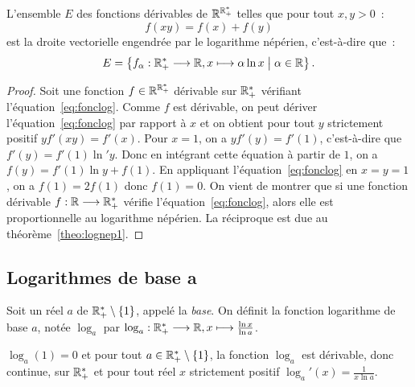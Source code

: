 \begin{theo}
    L'ensemble \(E\) des fonctions dérivables de \(\mathbb{R}^{\mathbb{R}_{+}^{*}}\) 
    telles que pour tout \(x,y>0\)~:
    \begin{equation}
        \label{eq:fonclog}
         f(xy) = f(x)+f(y)
    \end{equation}
    est la droite vectorielle engendrée par le logarithme népérien, 
    c'est-à-dire que~:
    \[E = \left\{f_{\alpha}:\mathbb{R}_{+}^{*} \longrightarrow \mathbb{R}, x \longmapsto \alpha \ln 
    x\mathrel{}\middle|\mathrel{}\alpha \in \mathbb{R}\right\}.\]
\end{theo}

\begin{proof}
    Soit une fonction \(f \in \mathbb{R}^{\mathbb{R}_{+}^{*}}\) dérivable sur 
    \(\mathbb{R}_{+}^{*}\) vérifiant l'équation~\eqref{eq:fonclog}. Comme \(f\) 
    est dérivable, on peut dériver l'équation~\eqref{eq:fonclog} par rapport 
    à \(x\) et on obtient pour tout \(y\) strictement positif 
    \(yf'(xy) = f'(x)\). Pour \(x = 1\), on a \(yf'(y) = f'(1)\), c'est-à-dire que 
    \(f'(y) = f'(1) \ln' y\). Donc en intégrant cette équation à partir de 
    \(1\), on a \(f(y) = f'(1)\ln y + f(1)\). En appliquant 
    l'équation~\eqref{eq:fonclog} en \(x = y = 1\), on a \(f(1) = 2f(1)\) donc 
    \(f(1) = 0\).
    On vient de montrer que si une fonction dérivable 
    \(f:\mathbb{R} \longrightarrow \mathbb{R}_{+}^{*}\) vérifie 
    l'équation~\eqref{eq:fonclog}, alors elle est proportionnelle au 
    logarithme népérien. La réciproque est due au 
    théorème~\ref{theo:lognep1}.
\end{proof}

\subsection{Logarithmes de base a}
\label{subsec:chap1-loga}

\begin{defdef}
    Soit un réel \(a\) de \(\mathbb{R}_{+}^{*}\setminus\{1\}\), appelé la 
    \emph{base}.  On définit la fonction logarithme de base  \(a\), notée 
    \(\log_a\) par \(\log_a:\mathbb{R}_{+}^{*} \longrightarrow \mathbb{R}, x \longmapsto \frac{\ln 
    x}{\ln a}\).
\end{defdef}

\begin{prop}
    \(\log_a(1) = 0\) et pour tout \(a \in\mathbb{R}_{+}^{*}\setminus\{1\}\), la 
    fonction \(\log_a\) est dérivable, donc continue, sur \(\mathbb{R}_{+}^{*}\) et 
    pour tout réel \(x\) strictement positif \(\log_a'(x) = \frac{1}{x \ln a}\).
\end{prop}

